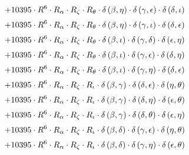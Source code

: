 \begin{subequations}
\begin{gather}
 \\[0.2em] \notag 		 + 10395 \cdot R^{6} \cdot R_{\alpha{}} \cdot R_{\zeta{}} \cdot R_{\theta{}} \cdot \delta{}\left(\beta{}, \eta{}\right) \cdot \delta{}\left(\gamma{}, \epsilon{}\right) \cdot \delta{}\left(\delta{}, \iota{}\right) 
 \\[0.2em] \notag 		 + 10395 \cdot R^{6} \cdot R_{\alpha{}} \cdot R_{\zeta{}} \cdot R_{\theta{}} \cdot \delta{}\left(\beta{}, \eta{}\right) \cdot \delta{}\left(\gamma{}, \iota{}\right) \cdot \delta{}\left(\delta{}, \epsilon{}\right) 
 \\[0.2em] \notag 		 + 10395 \cdot R^{6} \cdot R_{\alpha{}} \cdot R_{\zeta{}} \cdot R_{\theta{}} \cdot \delta{}\left(\beta{}, \iota{}\right) \cdot \delta{}\left(\gamma{}, \delta{}\right) \cdot \delta{}\left(\epsilon{}, \eta{}\right) 
 \\[0.2em] \notag 		 + 10395 \cdot R^{6} \cdot R_{\alpha{}} \cdot R_{\zeta{}} \cdot R_{\theta{}} \cdot \delta{}\left(\beta{}, \iota{}\right) \cdot \delta{}\left(\gamma{}, \epsilon{}\right) \cdot \delta{}\left(\delta{}, \eta{}\right) 
 \\[0.2em] \notag 		 + 10395 \cdot R^{6} \cdot R_{\alpha{}} \cdot R_{\zeta{}} \cdot R_{\theta{}} \cdot \delta{}\left(\beta{}, \iota{}\right) \cdot \delta{}\left(\gamma{}, \eta{}\right) \cdot \delta{}\left(\delta{}, \epsilon{}\right) 
 \\[0.2em] \notag 		 + 10395 \cdot R^{6} \cdot R_{\alpha{}} \cdot R_{\zeta{}} \cdot R_{\iota{}} \cdot \delta{}\left(\beta{}, \gamma{}\right) \cdot \delta{}\left(\delta{}, \epsilon{}\right) \cdot \delta{}\left(\eta{}, \theta{}\right) 
 \\[0.2em] \notag 		 + 10395 \cdot R^{6} \cdot R_{\alpha{}} \cdot R_{\zeta{}} \cdot R_{\iota{}} \cdot \delta{}\left(\beta{}, \gamma{}\right) \cdot \delta{}\left(\delta{}, \eta{}\right) \cdot \delta{}\left(\epsilon{}, \theta{}\right) 
 \\[0.2em] \notag 		 + 10395 \cdot R^{6} \cdot R_{\alpha{}} \cdot R_{\zeta{}} \cdot R_{\iota{}} \cdot \delta{}\left(\beta{}, \gamma{}\right) \cdot \delta{}\left(\delta{}, \theta{}\right) \cdot \delta{}\left(\epsilon{}, \eta{}\right) 
 \\[0.2em] \notag 		 + 10395 \cdot R^{6} \cdot R_{\alpha{}} \cdot R_{\zeta{}} \cdot R_{\iota{}} \cdot \delta{}\left(\beta{}, \delta{}\right) \cdot \delta{}\left(\gamma{}, \epsilon{}\right) \cdot \delta{}\left(\eta{}, \theta{}\right) 
 \\[0.2em] \notag 		 + 10395 \cdot R^{6} \cdot R_{\alpha{}} \cdot R_{\zeta{}} \cdot R_{\iota{}} \cdot \delta{}\left(\beta{}, \delta{}\right) \cdot \delta{}\left(\gamma{}, \eta{}\right) \cdot \delta{}\left(\epsilon{}, \theta{}\right) 

\end{gather}
\end{subequations}
